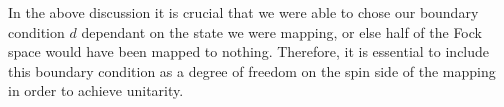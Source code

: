 \documentclass[aps,prl,twocolumn,floatfix,10pt,amssymb,amsfont,amsmath,superscriptaddress,float,nofootinbib,longbibliography,nobalancelastpage]{revtex4-2}
\begin{document}
In the above discussion it is crucial that we were able to chose our boundary condition $d$ dependant on the state we were mapping, or else half of the Fock space would have been mapped to nothing. Therefore, it is essential to include this boundary condition as a degree of freedom on the spin side of the mapping in order to achieve unitarity. 



\end{document}
